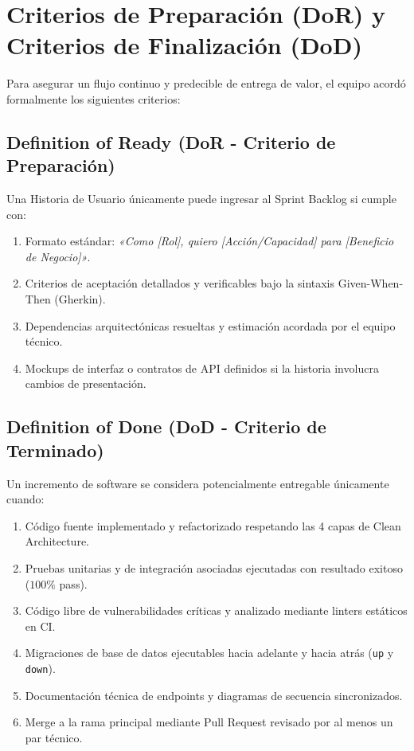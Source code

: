 \section{Criterios de Preparación (DoR) y Criterios de Finalización (DoD)}
Para asegurar un flujo continuo y predecible de entrega de valor, el equipo acordó formalmente los siguientes criterios:

\subsection{Definition of Ready (DoR - Criterio de Preparación)}
Una Historia de Usuario únicamente puede ingresar al Sprint Backlog si cumple con:
\begin{enumerate}
    \item Formato estándar: \textit{«Como [Rol], quiero [Acción/Capacidad] para [Beneficio de Negocio]»}.
    \item Criterios de aceptación detallados y verificables bajo la sintaxis Given-When-Then (Gherkin).
    \item Dependencias arquitectónicas resueltas y estimación acordada por el equipo técnico.
    \item Mockups de interfaz o contratos de API definidos si la historia involucra cambios de presentación.
\end{enumerate}

\subsection{Definition of Done (DoD - Criterio de Terminado)}
Un incremento de software se considera potencialmente entregable únicamente cuando:
\begin{enumerate}
    \item Código fuente implementado y refactorizado respetando las 4 capas de Clean Architecture.
    \item Pruebas unitarias y de integración asociadas ejecutadas con resultado exitoso ($100\%$ pass).
    \item Código libre de vulnerabilidades críticas y analizado mediante linters estáticos en CI.
    \item Migraciones de base de datos ejecutables hacia adelante y hacia atrás (\texttt{up} y \texttt{down}).
    \item Documentación técnica de endpoints y diagramas de secuencia sincronizados.
    \item Merge a la rama principal mediante Pull Request revisado por al menos un par técnico.
\end{enumerate}

